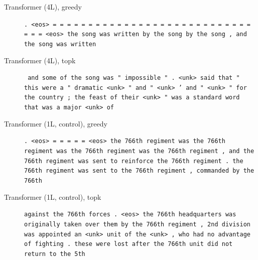 \begin{description}
\item[Transformer (4L), greedy] \texttt{\small . \textless{}eos\textgreater{} = = = = = = = = = = = = = = = = = = = = = = = = = = = = = = = \textless{}eos\textgreater{} the song was written by the song by the song , and the song was written}
\item[Transformer (4L), topk] \texttt{\small \textemdash{} and some of the song was " impossible " . \textless{}unk\textgreater{} said that " this were a " dramatic \textless{}unk\textgreater{} " and " \textless{}unk\textgreater{} ' and " \textless{}unk\textgreater{} " for the country ; the feast of their \textless{}unk\textgreater{} " was a standard word that was a major \textless{}unk\textgreater{} of}
\item[Transformer (1L, control), greedy] \texttt{\small . \textless{}eos\textgreater{} = = = = = \textless{}eos\textgreater{} the 766th regiment was the 766th regiment was the 766th regiment was the 766th regiment , and the 766th regiment was sent to reinforce the 766th regiment . the 766th regiment was sent to the 766th regiment , commanded by the 766th}
\item[Transformer (1L, control), topk] \texttt{\small against the 766th forces . \textless{}eos\textgreater{} the 766th headquarters was originally taken over them by the 766th regiment , 2nd division was appointed an \textless{}unk\textgreater{} unit of the \textless{}unk\textgreater{} , who had no advantage of fighting . these were lost after the 766th unit did not return to the 5th}
\end{description}
